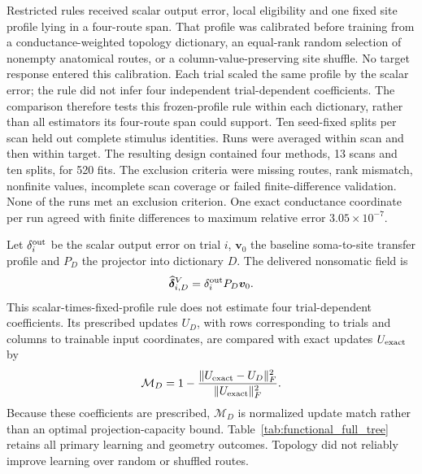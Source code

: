 Restricted rules received scalar output error, local eligibility and one
fixed site profile lying in a four-route span. That profile was calibrated before training from
a conductance-weighted topology dictionary, an equal-rank random selection of
nonempty anatomical routes, or a column-value-preserving site shuffle. No
target response entered this calibration. Each trial scaled the same profile
by the scalar error; the rule did not infer four independent trial-dependent
coefficients. The comparison therefore tests this frozen-profile rule within
each dictionary, rather than all estimators its four-route span could support.
Ten seed-fixed splits per scan held
out complete stimulus identities. Runs were averaged within scan and then
within target. The resulting design contained four methods, 13 scans and ten
splits, for 520 fits. The exclusion criteria were missing routes, rank mismatch, nonfinite values,
incomplete scan coverage or failed finite-difference validation. None of the
runs met an exclusion criterion. One exact conductance coordinate per run agreed with finite
differences to maximum relative error $3.05\times10^{-7}$.

Let $\delta_i^{\rm out}$ be the scalar output error on trial $i$, $\bm v_0$ the baseline soma-to-site transfer profile and $P_D$ the projector into dictionary $D$. The delivered nonsomatic field is
\begin{equation}
 \widehat{\bm\delta}^{V}_{i,D}=\delta_i^{\rm out}P_D\bm v_0.
 \label{eq:micronsrestrictedcredit}
\end{equation}
This scalar-times-fixed-profile rule does not estimate four trial-dependent coefficients. Its prescribed updates $U_D$, with rows corresponding to trials and columns to trainable input coordinates, are compared with exact updates $U_{\rm exact}$ by
\begin{equation}
 \mathcal M_D=1-\frac{\|U_{\rm exact}-U_D\|_F^2}{\|U_{\rm exact}\|_F^2}.
 \label{eq:micronsupdatematch}
\end{equation}
Because these coefficients are prescribed, $\mathcal M_D$ is normalized update match rather than an optimal projection-capacity bound. Table~\ref{tab:functional_full_tree} retains all primary learning and geometry outcomes. Topology did not reliably improve learning over random or shuffled routes.

